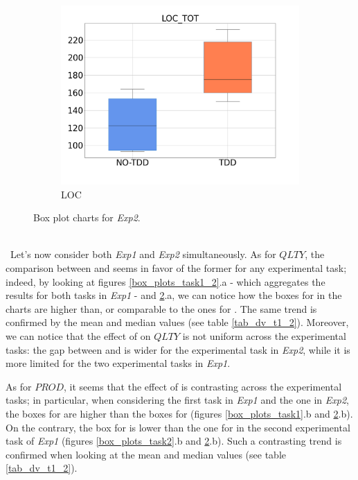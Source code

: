 \begin{figure}[htbp]
\begin{subfigure}{0.33\textwidth}
        \includegraphics[width=\linewidth]{figures/box_plots/task3/LOC.png}
        \caption{LOC}
        \label{bp_task3_loc}
    \end{subfigure}
    \caption{Box plot charts for \textit{Exp2}.}
    \label{box_plots_task3}
\end{figure}

\ \\ \
Let's now consider both \textit{Exp1} and \textit{Exp2} simultaneously. As for $QLTY$, the comparison between \tdd and \notdd seems in favor of the former for any experimental task; indeed, by looking at figures \ref{box_plots_task1_2}.a - which aggregates the results for both tasks in \textit{Exp1} - and \ref{box_plots_task3}.a, we can notice how the boxes for \tdd in the charts are higher than, or comparable to the ones for \notdd. The same trend is confirmed by the mean and median values (see table \ref{tab_dv_t1_2}). Moreover, we can notice that the effect of \tdd on $QLTY$ is not uniform across the experimental tasks: the gap between \tdd and \notdd is wider for the experimental task in \textit{Exp2}, while it is more limited for the two
experimental tasks in \textit{Exp1}.

As for $PROD$, it seems that the effect of \tdd is contrasting across the experimental tasks; in particular, when considering the first task in \textit{Exp1} and the one in \textit{Exp2}, the boxes for \tdd are  higher than the
boxes for \notdd (figures \ref{box_plots_task1}.b and \ref{box_plots_task3}.b). On the contrary, the box for \tdd is lower than the one for \notdd in the second experimental task of \textit{Exp1} (figures \ref{box_plots_task2}.b and \ref{box_plots_task3}.b). Such a contrasting trend is confirmed when looking at the mean and median values (see table \ref{tab_dv_t1_2}).


